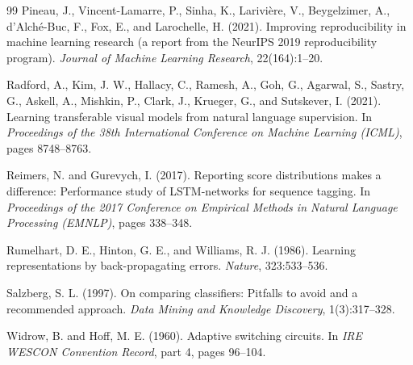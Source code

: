 \documentclass[12pt]{article}
\begin{document}
\begin{thebibliography}{99}
Pineau, J., Vincent-Lamarre, P., Sinha, K., Larivière, V., Beygelzimer, A.,
d'Alché-Buc, F., Fox, E., and Larochelle, H. (2021). Improving
reproducibility in machine learning research (a report from the NeurIPS 2019
reproducibility program). \emph{Journal of Machine Learning Research},
22(164):1--20.

Radford, A., Kim, J. W., Hallacy, C., Ramesh, A., Goh, G., Agarwal, S.,
Sastry, G., Askell, A., Mishkin, P., Clark, J., Krueger, G., and
Sutskever, I. (2021). Learning transferable visual models from natural
language supervision. In \emph{Proceedings of the 38th International
Conference on Machine Learning (ICML)}, pages 8748--8763.

Reimers, N. and Gurevych, I. (2017). Reporting score distributions makes a
difference: Performance study of LSTM-networks for sequence tagging. In
\emph{Proceedings of the 2017 Conference on Empirical Methods in Natural
Language Processing (EMNLP)}, pages 338--348.

Rumelhart, D. E., Hinton, G. E., and Williams, R. J. (1986). Learning
representations by back-propagating errors.
\emph{Nature}, 323:533--536.

Salzberg, S. L. (1997). On comparing classifiers: Pitfalls to avoid and a
recommended approach. \emph{Data Mining and Knowledge Discovery},
1(3):317--328.

Widrow, B. and Hoff, M. E. (1960). Adaptive switching circuits. In
\emph{IRE WESCON Convention Record}, part 4, pages 96--104.

\end{thebibliography}
\end{document}
